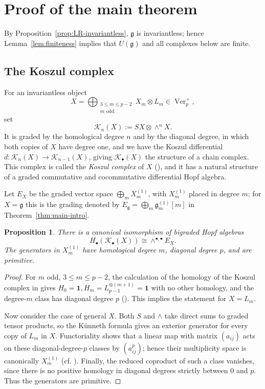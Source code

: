 \documentclass[12pt]{amsart}
\newtheorem{proposition}[theorem]{Proposition}
\theoremstyle{remark}
\DeclareMathOperator{\Ver}{Ver}
\newcommand{\g}{\mathfrak g}
\newcommand{\one}{\mathbf 1}
\newcommand{\cK}{\mathcal K}
\begin{document}
\section{Proof of the main theorem}\label{sec:proof-main}

By Proposition~\ref{prop:LR-invariantless}, $\g$ is invariantless; hence
Lemma~\ref{lem:finiteness} implies that $U(\g)$ and all complexes below are finite.

\subsection{The Koszul complex}

For an invariantless object
\[
 X=\bigoplus_{\substack{3\leq m\leq p-2\\m\text{ odd}}}X_m\otimes L_m
 \in\Ver_p^+,
\]
set
\[
\cK_n(X):=S X\otimes\wedge^nX.
\]
It is graded by the homological degree $n$ and by the diagonal degree, in
which both copies of $X$ have degree one, and we have the Koszul differential 
$d: \cK_n(X)\to \cK_{n-1}(X)$, giving $\cK_\bullet(X)$ the structure of a chain complex. This complex is called the {\it Koszul complex} of $X$ (\cite{Eti18}), and it has a natural structure of a graded commutative and cocommutative differential 
Hopf algebra.

Let $E_X$ be the graded vector
space $\bigoplus_m X_m^{(1)}$, with $X_m^{(1)}$ placed in degree $m$; for
$X=\g$ this is the grading denoted by
$E_\g=\bigoplus_m\g_m^{(1)}[m]$ in Theorem~\ref{thm:main-intro}.

\begin{proposition}\label{prop:koszul-general}
There is a canonical isomorphism of bigraded Hopf algebras
\[
 H_\bullet(\cK_\bullet(X))\cong\wedge^{\bullet,\bullet} E_X.
\]
The generators in $X_m^{(1)}$ have homological degree $m$, diagonal degree
$p$, and are primitive.
\end{proposition}

\begin{proof}
For $m$ odd, $3\leq m\leq p-2$, the calculation of the homology of the Koszul
complex in \cite{Eti18} gives
$H_0=\one, H_m=L_{p-1}^{\otimes(m+1)}=\one$
with no other homology, and the degree-$m$ class has diagonal degree $p$
(\cite[Proposition~5.1]{Eti18}).  This implies the statement for 
$X=L_m$.

Now consider the case of general $X$. Both $S$ and $\wedge$ take direct sums to graded tensor products, so the
K\"unneth formula gives an exterior generator for every copy of $L_m$ in
$X$.  Functoriality shows that a linear map with matrix $(a_{ij})$ acts on
these diagonal-degree-$p$ classes by $(a_{ij}^p)$; hence their multiplicity
space is canonically $X_m^{(1)}$ (cf. \cite[Corollary~5.2]{Eti18}). Finally, the reduced coproduct of such a
class vanishes, since there is no positive homology in diagonal degrees
strictly between $0$ and $p$.  Thus the generators are primitive.
\end{proof}
\end{document}
